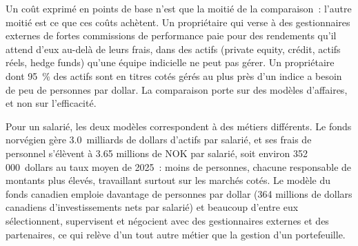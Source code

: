 \begin{omfigure}

\label{fig:in:asset-managers-pensions-sovereign-funds-and-insurers:costs}
\end{omfigure}

\begin{remark}\label{rem:in:asset-managers-pensions-sovereign-funds-and-insurers:models}
Un coût exprimé en points de base n'est que la moitié de la comparaison~: l'autre moitié est ce que ces coûts achètent. Un propriétaire qui verse à des
gestionnaires externes de fortes commissions de performance paie pour des rendements qu'il attend d'eux au-delà de leurs frais, dans des actifs (private
equity, crédit, actifs réels, hedge funds) qu'une équipe indicielle ne peut pas gérer. Un propriétaire dont 95~\% des actifs sont en titres
cotés gérés au plus près d'un indice a besoin de peu de personnes par dollar. La comparaison porte sur des modèles d'affaires, et non
sur l'efficacité.
\end{remark}

Pour un salarié, les deux modèles correspondent à des métiers différents. Le fonds norvégien gère 3.0~milliards de dollars d'actifs par salarié, et
ses frais de personnel s'élèvent à 3.65 millions de NOK par salarié, soit environ 352\,000~dollars au taux moyen de 2025~: moins de personnes, chacune
responsable de montants plus élevés, travaillant surtout sur les marchés cotés. Le modèle du fonds canadien emploie davantage de personnes par dollar
(364 millions de dollars canadiens d'investissements nets par salarié) et beaucoup d'entre eux sélectionnent, supervisent et négocient avec des gestionnaires externes
et des partenaires, ce qui relève d'un tout autre métier que la gestion d'un portefeuille.


